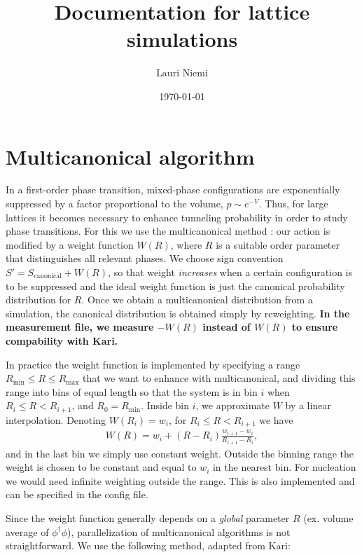 \documentclass[11pt,a4paper]{article}
\title{Documentation for lattice simulations}
\author{Lauri Niemi}
\date{\today}
\newcommand\lauri[1]{{\color{myorange}#1}}
\begin{document}
\maketitle


\section{Multicanonical algorithm}

In a first-order phase transition, mixed-phase configurations are exponentially suppressed by a factor proportional to the volume, $p \sim e^{-V}$. Thus, for large lattices it becomes necessary to enhance tunneling probability in order to study phase transitions. For this we use the multicanonical method \cite{Berg:1991cf}: our action is modified by a weight function $W(R)$, where $R$ is a suitable order parameter that distinguishes all relevant phases. We choose sign convention $S' = S_\text{canonical} + W(R)$, so that weight \textit{increases} when a certain configuration is to be suppressed and the ideal weight function is just the canonical probability distribution for $R$. Once we obtain a multicanonical distribution from a simulation, the canonical distribution is obtained simply by reweighting. \textbf{In the measurement file, we measure $-W(R)$ instead of $W(R)$ to ensure compability with Kari.}

In practice the weight function is implemented by specifying a range $R_\text{min} \leq R \leq R_\text{max}$ that we want to enhance with multicanonical, and dividing this range into bins of equal length so that the system is in bin $i$ when $R_{i} \leq R < R_{i+1}$, and $R_0 = R_\text{min}$. Inside bin $i$, we approximate $W$ by a linear interpolation. Denoting $W(R_i) = w_i$, for $R_{i} \leq R < R_{i+1}$ we have 
\begin{align}
W(R) = w_i + (R - R_i) \frac{w_{i+1} - w_i}{R_{i+1} - R_i},
\end{align}
and in the last bin we simply use constant weight. Outside the binning range the weight is chosen to be constant and equal to $w_i$ in the nearest bin. \lauri{For nucleation we would need infinite weighting outside the range. This is also implemented and can be specified in the config file.}

Since the weight function generally depends on a \textit{global} parameter $R$ (ex. volume average of $\phi^\dagger\phi$), parallelization of multicanonical algorithms is not straightforward. We use the following method, adapted from Kari: 
\end{document}
